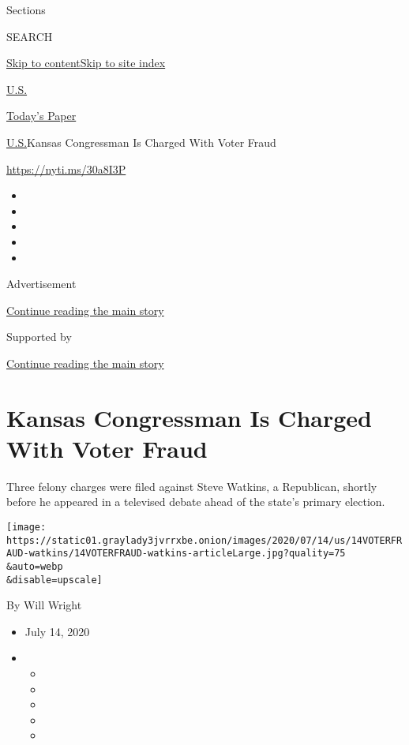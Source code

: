 Sections

SEARCH

\protect\hyperlink{site-content}{Skip to
content}\protect\hyperlink{site-index}{Skip to site index}

\href{https://www.nytimes3xbfgragh.onion/section/us}{U.S.}

\href{https://myaccount.nytimes3xbfgragh.onion/auth/login?response_type=cookie\&client_id=vi}{}

\href{https://www.nytimes3xbfgragh.onion/section/todayspaper}{Today's
Paper}

\href{/section/us}{U.S.}\textbar{}Kansas Congressman Is Charged With
Voter Fraud

\href{https://nyti.ms/30a8I3P}{https://nyti.ms/30a8I3P}

\begin{itemize}
\item
\item
\item
\item
\item
\end{itemize}

Advertisement

\protect\hyperlink{after-top}{Continue reading the main story}

Supported by

\protect\hyperlink{after-sponsor}{Continue reading the main story}

\hypertarget{kansas-congressman-is-charged-with-voter-fraud}{%
\section{Kansas Congressman Is Charged With Voter
Fraud}\label{kansas-congressman-is-charged-with-voter-fraud}}

Three felony charges were filed against Steve Watkins, a Republican,
shortly before he appeared in a televised debate ahead of the state's
primary election.

\texttt{[image: https://static01.graylady3jvrrxbe.onion/images/2020/07/14/us/14VOTERFRAUD-watkins/14VOTERFRAUD-watkins-articleLarge.jpg?quality=75\\\&auto=webp\\\&disable=upscale]}

By Will Wright

\begin{itemize}
\item
  July 14, 2020
\item
  \begin{itemize}
  \item
  \item
  \item
  \item
  \item
  \end{itemize}
\end{itemize}

